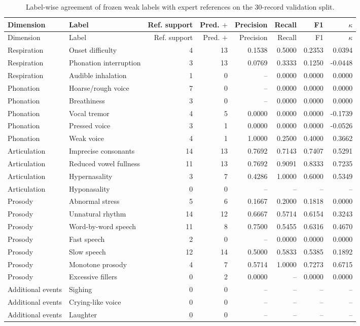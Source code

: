 \documentclass[10pt]{article}
\begin{document}
\begin{longtable}{llrrrrrr}
\caption{Label-wise agreement of frozen weak labels with expert references on the 30-record validation split.} \label{tab:weak_label}\\
\toprule
Dimension & Label & Ref. support & Pred. $+$ & Precision & Recall & F1 & $\kappa$ \\
\midrule
\endfirsthead
\toprule
Dimension & Label & Ref. support & Pred. $+$ & Precision & Recall & F1 & $\kappa$ \\
\midrule
\endhead

Respiration & Onset difficulty & 4 & 13 & 0.1538 & 0.5000 & 0.2353 & 0.0394 \\
Respiration & Phonation interruption & 3 & 13 & 0.0769 & 0.3333 & 0.1250 & -0.0448 \\
Respiration & Audible inhalation & 1 & 0 & -- & 0.0000 & 0.0000 & 0.0000 \\
Phonation & Hoarse/rough voice & 7 & 0 & -- & 0.0000 & 0.0000 & 0.0000 \\
Phonation & Breathiness & 3 & 0 & -- & 0.0000 & 0.0000 & 0.0000 \\
Phonation & Vocal tremor & 4 & 5 & 0.0000 & 0.0000 & 0.0000 & -0.1739 \\
Phonation & Pressed voice & 3 & 1 & 0.0000 & 0.0000 & 0.0000 & -0.0526 \\
Phonation & Weak voice & 4 & 1 & 1.0000 & 0.2500 & 0.4000 & 0.3662 \\
Articulation & Imprecise consonants & 14 & 13 & 0.7692 & 0.7143 & 0.7407 & 0.5291 \\
Articulation & Reduced vowel fullness & 11 & 13 & 0.7692 & 0.9091 & 0.8333 & 0.7235 \\
Articulation & Hypernasality & 3 & 7 & 0.4286 & 1.0000 & 0.6000 & 0.5349 \\
Articulation & Hyponasality & 0 & 0 & -- & -- & -- & -- \\
Prosody & Abnormal stress & 5 & 6 & 0.1667 & 0.2000 & 0.1818 & 0.0000 \\
Prosody & Unnatural rhythm & 14 & 12 & 0.6667 & 0.5714 & 0.6154 & 0.3243 \\
Prosody & Word-by-word speech & 11 & 8 & 0.7500 & 0.5455 & 0.6316 & 0.4670 \\
Prosody & Fast speech & 2 & 0 & -- & 0.0000 & 0.0000 & 0.0000 \\
Prosody & Slow speech & 12 & 14 & 0.5000 & 0.5833 & 0.5385 & 0.1892 \\
Prosody & Monotone prosody & 4 & 7 & 0.5714 & 1.0000 & 0.7273 & 0.6715 \\
Prosody & Excessive fillers & 0 & 2 & 0.0000 & -- & 0.0000 & 0.0000 \\
Additional events & Sighing & 0 & 0 & -- & -- & -- & -- \\
Additional events & Crying-like voice & 0 & 0 & -- & -- & -- & -- \\
Additional events & Laughter & 0 & 0 & -- & -- & -- & -- \\
\bottomrule
\end{longtable}
\end{document}
